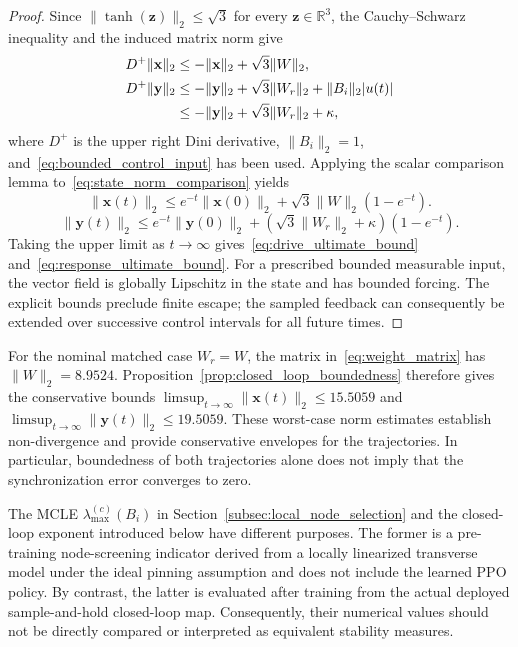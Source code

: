 \documentclass[a4paper,fleqn]{cas-dc}
\theoremstyle{plain}
\theoremstyle{definition}
\begin{document}
\begin{proof}
Since $\|\tanh(\mathbf{z})\|_2\leq\sqrt{3}$ for every $\mathbf{z}\in\mathbb{R}^3$, the Cauchy--Schwarz inequality and the induced matrix norm give
\begin{align}
	D^+\|\mathbf{x}\|_2
	&\leq-\|\mathbf{x}\|_2+\sqrt{3}\|W\|_2, \notag\\
	D^+\|\mathbf{y}\|_2
	&\leq-\|\mathbf{y}\|_2+\sqrt{3}\|W_r\|_2+\|B_i\|_2|u(t)| \notag\\
	&\leq-\|\mathbf{y}\|_2+\sqrt{3}\|W_r\|_2+\kappa,
	\label{eq:state_norm_comparison}
\end{align}
where $D^+$ is the upper right Dini derivative, $\|B_i\|_2=1$, and~\eqref{eq:bounded_control_input} has been used. Applying the scalar comparison lemma to~\eqref{eq:state_norm_comparison} yields
\begin{equation}
	\|\mathbf{x}(t)\|_2
	\leq e^{-t}\|\mathbf{x}(0)\|_2
	+\sqrt{3}\|W\|_2(1-e^{-t}).
	\label{eq:drive_explicit_bound}
\end{equation}
\begin{equation}
	\|\mathbf{y}(t)\|_2
	\leq e^{-t}\|\mathbf{y}(0)\|_2
	+\left(\sqrt{3}\|W_r\|_2+\kappa\right)(1-e^{-t}).
	\label{eq:response_explicit_bound}
\end{equation}
Taking the upper limit as $t\to\infty$ gives~\eqref{eq:drive_ultimate_bound} and~\eqref{eq:response_ultimate_bound}. For a prescribed bounded measurable input, the vector field is globally Lipschitz in the state and has bounded forcing. The explicit bounds preclude finite escape; the sampled feedback can consequently be extended over successive control intervals for all future times.
\end{proof}

For the nominal matched case $W_r=W$, the matrix in~\eqref{eq:weight_matrix} has $\|W\|_2=8.9524$. Proposition~\ref{prop:closed_loop_boundedness} therefore gives the conservative bounds $\limsup_{t\to\infty}\|\mathbf{x}(t)\|_2\leq15.5059$ and $\limsup_{t\to\infty}\|\mathbf{y}(t)\|_2\leq19.5059$. These worst-case norm estimates establish non-divergence and provide conservative envelopes for the trajectories. In particular, boundedness of both trajectories alone does not imply that the synchronization error converges to zero.

The MCLE $\lambda_{\max}^{(c)}(B_i)$ in Section~\ref{subsec:local_node_selection} and the closed-loop exponent introduced below have different purposes. The former is a pre-training node-screening indicator derived from a locally linearized transverse model under the ideal pinning assumption and does not include the learned PPO policy. By contrast, the latter is evaluated after training from the actual deployed sample-and-hold closed-loop map. Consequently, their numerical values should not be directly compared or interpreted as equivalent stability measures.
\end{document}
